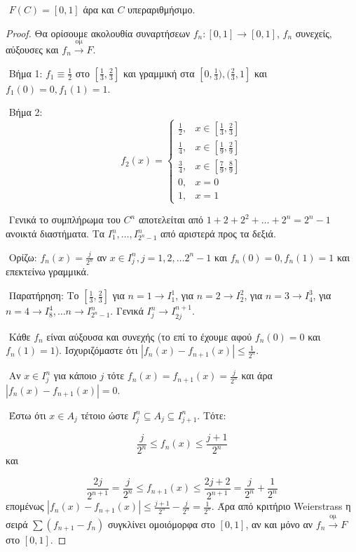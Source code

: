 $ $\newline
$F(C) = [0,1]$ άρα και $C$ υπεραριθμήσιμο.

\begin{proof} Θα ορίσουμε ακολουθία συναρτήσεων $f_n : [0,1] \rightarrow [0,1]$, $f_n$ συνεχείς, αύξουσες και $f_n \overset{\text{ομ}}{\rightarrow} F$.
    
    $ $\newline
    Βήμα 1: $f_1  \equiv \frac{1}{2}$ στο $[\frac{1}{3}, \frac{2}{3}]$ και γραμμική στα $[0,\frac13), (\frac23,1]$ και $f_1 (0) = 0, f_1(1) = 1$.

    $ $\newline
    Βήμα 2: 
    $$f_2(x) = \begin{cases}
        \frac12, &  x \in [\frac13, \frac23] \\
        \frac14, &  x \in [\frac19, \frac29] \\
        \frac34, &  x \in [\frac79, \frac89] \\
        0, & x=0 \\
        1, & x=1
    \end{cases}$$
    
    $ $\newline
    Γενικά το συμπλήρωμα του $C^n$ αποτελείται από $1+2+2^2 + \ldots + 2^n = 2^n -1 $ ανοικτά διαστήματα. Τα $I^n_1, \ldots, I^n_{2^n-1}$ από αριστερά προς τα δεξιά.

    $ $\newline
    Ορίζω: $f_n(x) = \frac{j}{2^n}$ αν $x \in I^n_j, j = 1,2,\ldots 2^n-1$ και $f_n(0) = 0, f_n(1) = 1$ και επεκτείνω γραμμικά.

    $ $\newline
    Παρατήρηση: Το $[\frac13, \frac23]$ για $n=1 \rightarrow I^1_1$, για $n=2 \rightarrow I^2_2$, για $n=3 \rightarrow I^3_4$, για $n = 4 \rightarrow I^4_8, \ldots n \rightarrow I^n_{2^n-1}$. Γενικά $I^n_j \rightarrow I^{n+1}_{2j}$.

    $ $\newline
    Κάθε $f_n$ είναι αύξουσα και συνεχής (το επί το έχουμε αφού $f_n(0)= 0 $ και $f_n (1)= 1$). Ισχυριζόμαστε ότι $|f_n (x) - f_{n+1}(x) | \leq \frac{1}{2^n}$.
    
    $ $\newline
    Αν $x \in I^n_j$ για κάποιο $j$ τότε $f_n(x) = f_{n+1}(x) = \frac{j}{2^n}$ και άρα $|f_n(x) - f_{n+1}(x)| = 0$.

    $ $\newline
    Έστω ότι $x \in A_j$ τέτοιο ώστε $I^n_j \subseteq A_j \subseteq I^n_{j+1}$. Τότε:

    $$\frac{j}{2^n} \leq f_n(x) \leq \frac{j+1}{2^n}$$ και 

    $$\frac{2j}{2^{n+1}} = \frac{j}{2^n} \leq f_{n+1} (x) \leq \frac{2j + 2}{2^{n+1}} = \frac{j}{2^n} + \frac{1}{2^n}$$ επομένως $|f_n(x) - f_{n+1}(x)| \leq \frac{j+1}{2^n} - \frac{j}{2^n} = \frac{1}{2^n}$. Άρα από κριτήριο {\eng Weierstrass} η σειρά $\sum (f_{n+1} - f_n)$ συγκλίνει ομοιόμορφα στο $[0,1]$, αν και μόνο αν $f_n \overset{\text{ομ}}{\rightarrow} F$ στο $[0,1]$.

\end{proof}


